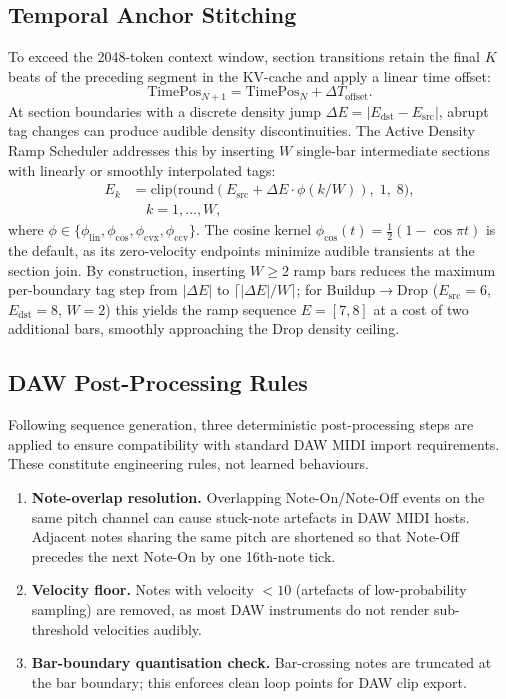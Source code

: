 \documentclass[pdflatex,sn-mathphys-num,twocolumn]{sn-jnl}
\theoremstyle{thmstyleone}
\theoremstyle{thmstyletwo}
\begin{document}
\subsection{Temporal Anchor Stitching}
\label{sec:stitching}
To exceed the 2048-token context window, section transitions retain the final $K$ beats of the preceding segment in the KV-cache and apply a linear time offset:
\begin{equation}
\mathrm{TimePos}_{N+1} = \mathrm{TimePos}_N + \Delta T_{\mathrm{offset}}.
\end{equation}
At section boundaries with a discrete density jump $\Delta E = |E_{\mathrm{dst}}-E_{\mathrm{src}}|$, abrupt tag changes can produce audible density discontinuities. The Active Density Ramp Scheduler addresses this by inserting $W$ single-bar intermediate sections with linearly or smoothly interpolated tags:
\begin{align}
E_k &= \mathrm{clip}\!\bigl(\mathrm{round}(E_{\mathrm{src}}+\Delta E\cdot\phi(k/W)),\;1,\;8\bigr), \nonumber\\
    &\quad k=1,\dots,W,
\end{align}
where $\phi\in\{\phi_{\mathrm{lin}},\phi_{\mathrm{cos}},\phi_{\mathrm{cvx}},\phi_{\mathrm{ccv}}\}$. The cosine kernel $\phi_{\mathrm{cos}}(t)=\tfrac{1}{2}(1-\cos\pi t)$ is the default, as its zero-velocity endpoints minimize audible transients at the section join. By construction, inserting $W\geq 2$ ramp bars reduces the maximum per-boundary tag step from $|\Delta E|$ to $\lceil|\Delta E|/W\rceil$; for Buildup$\to$Drop ($E_{\mathrm{src}}=6$, $E_{\mathrm{dst}}=8$, $W=2$) this yields the ramp sequence $E=[7,8]$ at a cost of two additional bars, smoothly approaching the Drop density ceiling.


\subsection{DAW Post-Processing Rules}
\label{sec:postproc}
Following sequence generation, three deterministic post-processing steps are applied to ensure compatibility with standard DAW MIDI import requirements. These constitute engineering rules, not learned behaviours.

\begin{enumerate}[nosep,leftmargin=*]
  \item \textbf{Note-overlap resolution.} Overlapping Note-On/Note-Off events on the same pitch channel can cause stuck-note artefacts in DAW MIDI hosts. Adjacent notes sharing the same pitch are shortened so that Note-Off precedes the next Note-On by one 16th-note tick.
  \item \textbf{Velocity floor.} Notes with velocity $< 10$ (artefacts of low-probability sampling) are removed, as most DAW instruments do not render sub-threshold velocities audibly.
  \item \textbf{Bar-boundary quantisation check.} Bar-crossing notes are truncated at the bar boundary; this enforces clean loop points for DAW clip export.
\end{enumerate}
\end{document}
